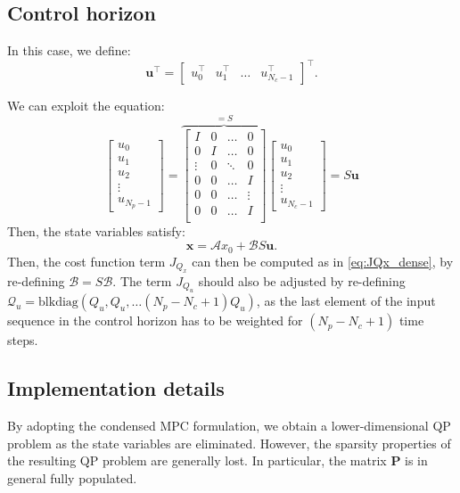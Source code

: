 \documentclass[a4paper,12pt,fleqn]{article}
\newcommand{\PQP}{\mathbf{P}}
\newcommand{\varxvec}{\mathbf{x}}
\newcommand{\varuvec}{\mathbf{u}}
\newcommand{\Np}{{N_p}}
\newcommand{\Nc}{{N_c}}
\newcommand{\blkdiag}{\text{blkdiag}}
\begin{document}
\subsection{Control horizon}
In this case, we define:
\begin{equation}
\varuvec^\top = \begin{bmatrix} u_0^\top &u_1^\top &\dots& u_{\Nc-1}^\top\end{bmatrix}^\top.
\end{equation}

We can exploit the equation:
\begin{equation}
 \begin{bmatrix}
  u_0 \\ u_1 \\ u_2 \\ \vdots\\ u_{\Np-1}
 \end{bmatrix} = 
 \overbrace{
 \begin{bmatrix}
 I      &0      &\dots  & 0\\
 0      &I      &\dots  &0\\
 \vdots &0      &\ddots & 0\\
 0      &0      &\dots  &I\\
 0      &0      &\dots  &\vdots\\
 0      &0      &\dots  &I\\
\end{bmatrix}
}^{=S}
 \begin{bmatrix}
  u_0 \\ u_1 \\ u_2 \\ \vdots\\ u_{\Nc-1}
 \end{bmatrix} 
 = S \varuvec
\end{equation}
Then, the state variables satisfy:
\begin{equation}
 \varxvec = \mathcal{A}x_0 + \mathcal{B}S \varuvec.
\end{equation}
Then, the cost function term $J_{Q_x}$ can then be computed as in \eqref{eq:JQx_dense}, by re-defining $\mathcal{B} = S\mathcal{B}$.
The term $J_{Q_u}$ should also be adjusted by re-defining $\mathcal{Q}_u = \blkdiag\left (Q_u, Q_u, \dots (\Np - \Nc + 1)Q_u \right)$, as the last element of the input sequence in the control horizon has to be weighted for $(\Np - \Nc + 1)$ time steps.

\subsection{Implementation details}
By adopting the condensed MPC formulation, we obtain a lower-dimensional QP problem as the state variables are eliminated. 
However, the sparsity properties of the resulting QP problem are generally lost. In particular, the matrix $\PQP$ is in general 
fully populated. 
\end{document}
